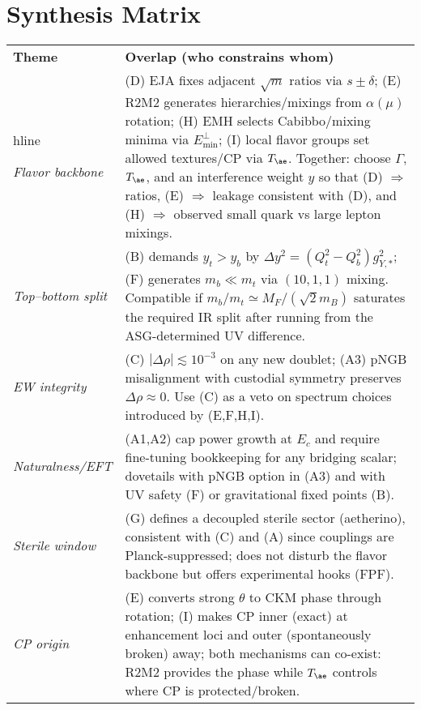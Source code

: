 \section*{ Synthesis Matrix}

\renewcommand{\arraystretch}{1.15}

\begin{tabular}{p{3.1cm}|p{12.3cm}}

\textbf{Theme} & \textbf{Overlap (who constrains whom)}\\hline

\emph{Flavor backbone} & (D) EJA fixes adjacent $\sqrt{m}$ ratios via $s\pm\delta$; (E) R2M2 generates hierarchies/mixings from $\alpha(\mu)$ rotation; (H) EMH selects Cabibbo/mixing minima via $E^{\perp}_{\min}$; (I) local flavor groups set allowed textures/CP via $T_{\ae}$. Together: choose $\Gamma$, $T_{\ae}$, and an interference weight $y$ so that (D) $\Rightarrow$ ratios, (E) $\Rightarrow$ leakage consistent with (D), and (H) $\Rightarrow$ observed small quark vs large lepton mixings.\\

\emph{Top--bottom split} & (B) demands $y_{t}>y_{b}$ by $\Delta y^2 = (Q_t^2 - Q_b^2)g_{Y,*}^2$; (F) generates $m_b\ll m_t$ via $(10,1,1)$ mixing. Compatible if $m_b/m_t\simeq M_F/(\sqrt{2} m_B)$ saturates the required IR split after running from the ASG-determined UV difference.\\

\emph{EW integrity} & (C) $|\Delta\rho|\lesssim 10^{-3}$ on any new doublet; (A3) pNGB misalignment with custodial symmetry preserves $\Delta\rho\approx 0$. Use (C) as a veto on spectrum choices introduced by (E,F,H,I).\\

\emph{Naturalness/EFT} & (A1,A2) cap power growth at $E_c$ and require fine-tuning bookkeeping for any bridging scalar; dovetails with pNGB option in (A3) and with UV safety (F) or gravitational fixed points (B).\\

\emph{Sterile window} & (G) defines a decoupled sterile sector (aetherino), consistent with (C) and (A) since couplings are Planck-suppressed; does not disturb the flavor backbone but offers experimental hooks (FPF).\\

\emph{CP origin} & (E) converts strong $\theta$ to CKM phase through rotation; (I) makes CP inner (exact) at enhancement loci and outer (spontaneously broken) away; both mechanisms can co-exist: R2M2 provides the phase while $T_{\ae}$ controls where CP is protected/broken.\\

\end{tabular}

